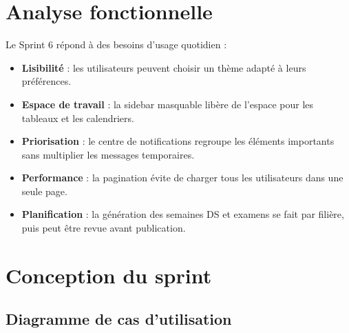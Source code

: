\documentclass[12pt,a4paper]{report}
\begin{document}
\section{Analyse fonctionnelle}

Le Sprint 6 répond à des besoins d'usage quotidien :

\begin{itemize}[itemsep=0.4em]
    \item \textbf{Lisibilité} : les utilisateurs peuvent choisir un thème adapté à leurs préférences.
    \item \textbf{Espace de travail} : la sidebar masquable libère de l'espace pour les tableaux et les calendriers.
    \item \textbf{Priorisation} : le centre de notifications regroupe les éléments importants sans multiplier les messages temporaires.
    \item \textbf{Performance} : la pagination évite de charger tous les utilisateurs dans une seule page.
    \item \textbf{Planification} : la génération des semaines DS et examens se fait par filière, puis peut être revue avant publication.
\end{itemize}

\section{Conception du sprint}

\subsection*{Diagramme de cas d'utilisation}
\end{document}
